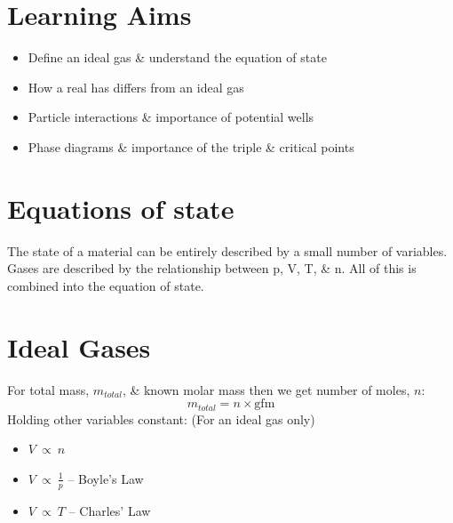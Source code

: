 \documentclass[a4paper, 11pt, normalem]{report}
\begin{document}
\section{Learning Aims}
\begin{itemize}
	\item Define an ideal gas \& understand the equation of state
	\item How a real has differs from an ideal gas
	\item Particle interactions \& importance of potential wells
	\item Phase diagrams \& importance of the triple \& critical points
\end{itemize}

\section{Equations of state}
The state of a material can be entirely described by a small number of variables.
Gases are described by the relationship between p, V, T, \& n.
All of this is combined into the equation of state.

\section{Ideal Gases}
For total mass, $m_{total}$, \& known molar mass then we get number of moles, $n$:
\begin{equation}
	m_{total} = n \times \text{gfm}
\end{equation}
Holding other variables constant: (For an ideal gas only)
\begin{itemize}
	\item $V~\propto~n$
	\item $V~\propto~\frac{1}{p}$ -- Boyle's Law
	\item $V~\propto~T$ -- Charles' Law
\end{itemize}
\end{document}
